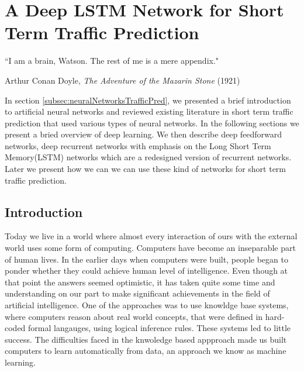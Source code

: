
\chapter{A Deep LSTM Network for Short Term Traffic Prediction} %

\label{Chapter4} %


{``I am a brain, Watson. The rest of me is a mere appendix."}
\begin{flushright}
Arthur Conan Doyle, \textit{The Adventure of the Mazarin Stone} (1921)
\end{flushright}


In section \ref{subsec:neuralNetworksTrafficPred}, we presented a brief introduction to artificial
neural networks and reviewed existing literature in short term traffic prediction that used
various types of neural networks. In the following sections we present a bried overview of deep
learning. We then describe deep feedforward networks, deep recurrent networks with emphasis on
the Long Short Term Memory(LSTM) networks which are a redesigned version of recurrent networks.
Later we present how we can we can use these kind of networks for short term traffic prediction.

\section{Introduction}
Today we live in a world where almost every interaction of ours with the external world uses some
form of computing. Computers have become an inseparable part of human lives. In the earlier days
when computers were built, people began to ponder whether they could achieve human level
of intelligence. Even though at that point the answers seemed optimistic, it has taken quite
some time and understanding on our part to make significant achievements in the field of
artificial intelligence. One of the approaches was to use knowldge base systems, where computers
reason about real world concepts, that were defined in hard-coded formal langauges, using logical
inference rules. These systems led to little success. The difficulties faced in the knwoledge
based appproach made us built computers to learn automatically from data, an approach we know as
machine learning.

